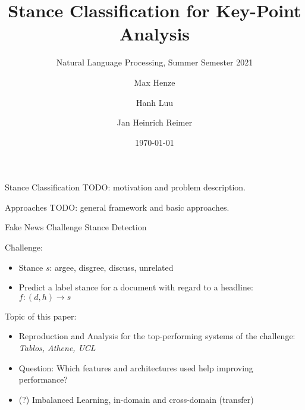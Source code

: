 \documentclass[english,handout]{mlutalk}
\title{Stance Classification for Key-Point Analysis}
\subtitle{Natural Language Processing, Summer Semester 2021}
\author{Max Henze \and Hanh Luu \and Jan Heinrich Reimer}
\institute{Martin Luther University Halle-Wittenberg}
\date{\today}
\begin{document}
\titleframe

\begin{frame}{Stance Classification} %
  TODO: motivation and problem description.
\end{frame}

\begin{frame}{Approaches} %
  TODO: general framework and basic approaches.
\end{frame}

\begin{frame}{Fake News Challenge Stance Detection~\cite{HanselowskiSSCC2018}}
  \begin{example}
  \end{example}
  Challenge: %
  \begin{itemize}
      \item Stance $s$: argee, disgree, discuss, unrelated
      \item Predict a label stance for a document with regard to a headline: $f: (d,h) \rightarrow s$
  \end{itemize}
  Topic of this paper:
  \begin{itemize}
    \item Reproduction and Analysis for the top-performing systems of the challenge: \textit{Tablos, Athene, UCL}
    \item Question: Which features and architectures used help improving performance?
    \item (?) Imbalanced Learning, in-domain and cross-domain (transfer)
  \end{itemize}
\end{frame}
\end{document}
